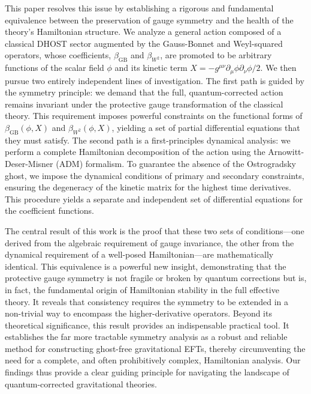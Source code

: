 \documentclass[twocolumn]{aastex631}
\begin{document}
This paper resolves this issue by establishing a rigorous and fundamental equivalence between the preservation of gauge symmetry and the health of the theory's Hamiltonian structure. We analyze a general action composed of a classical DHOST sector augmented by the Gauss-Bonnet and Weyl-squared operators, whose coefficients, $\beta_{\text{GB}}$ and $\beta_{W^2}$, are promoted to be arbitrary functions of the scalar field $\phi$ and its kinetic term $X = -g^{\mu\nu}\partial_\mu\phi\partial_\nu\phi/2$. We then pursue two entirely independent lines of investigation. The first path is guided by the symmetry principle: we demand that the full, quantum-corrected action remains invariant under the protective gauge transformation of the classical theory. This requirement imposes powerful constraints on the functional forms of $\beta_{\text{GB}}(\phi, X)$ and $\beta_{W^2}(\phi, X)$, yielding a set of partial differential equations that they must satisfy. The second path is a first-principles dynamical analysis: we perform a complete Hamiltonian decomposition of the action using the Arnowitt-Deser-Misner (ADM) formalism. To guarantee the absence of the Ostrogradsky ghost, we impose the dynamical conditions of primary and secondary constraints, ensuring the degeneracy of the kinetic matrix for the highest time derivatives. This procedure yields a separate and independent set of differential equations for the coefficient functions.

The central result of this work is the proof that these two sets of conditions---one derived from the algebraic requirement of gauge invariance, the other from the dynamical requirement of a well-posed Hamiltonian---are mathematically identical. This equivalence is a powerful new insight, demonstrating that the protective gauge symmetry is not fragile or broken by quantum corrections but is, in fact, the fundamental origin of Hamiltonian stability in the full effective theory. It reveals that consistency requires the symmetry to be extended in a non-trivial way to encompass the higher-derivative operators. Beyond its theoretical significance, this result provides an indispensable practical tool. It establishes the far more tractable symmetry analysis as a robust and reliable method for constructing ghost-free gravitational EFTs, thereby circumventing the need for a complete, and often prohibitively complex, Hamiltonian analysis. Our findings thus provide a clear guiding principle for navigating the landscape of quantum-corrected gravitational theories.
\end{document}
